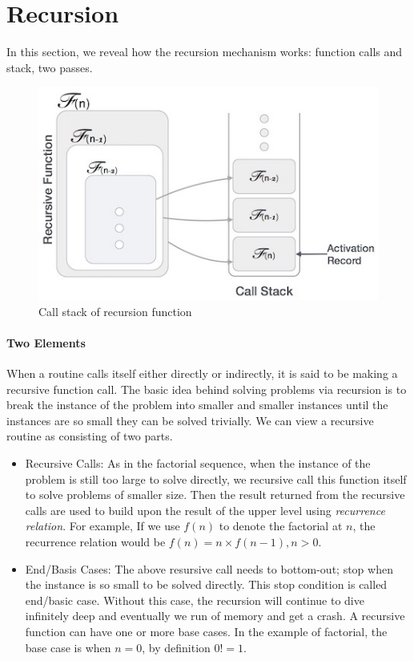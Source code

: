 \documentclass[../main.tex]{subfiles}
\begin{document}
\section{Recursion}
In this section, we reveal how the recursion mechanism works: function calls and stack, two passes. 
\label{sec_recursion}
\begin{figure}[!ht]
    \centering
    \includegraphics[width=0.6\columnwidth]{fig/activation_records.png}
    \caption{Call stack of recursion function}
    \label{fig:call_stack_recursion_function}
\end{figure}
\paragraph{Two Elements}
When a routine calls itself either directly or indirectly, it is said to be making a recursive function call. The basic idea behind solving problems via recursion is to break the instance of the problem into smaller and smaller instances until the instances are so small they can be solved trivially. We can view a recursive routine as consisting of two parts. 
\begin{itemize}
    \item Recursive Calls: As in the factorial sequence, when the instance of the problem is still too large to solve directly, we recursive call this function itself to solve problems of smaller size. Then the result returned from the recursive calls are used to build upon the result of the upper level using \textit{recurrence relation}. For example, If we use $f(n)$ to denote the factorial at $n$, the recurrence relation would be $f(n)=n\times f(n-1), n>0$.
    \item End/Basis  Cases: The above resursive call needs to bottom-out; stop when the instance is so small to be solved directly. This stop condition is called end/basic case. Without this case, the recursion will continue to dive infinitely deep and eventually we run of memory and get a crash. A recursive function can have one or more base cases. In the example of factorial, the base case is when $n=0$, by definition $0!=1$.
\end{itemize}
\end{document}
